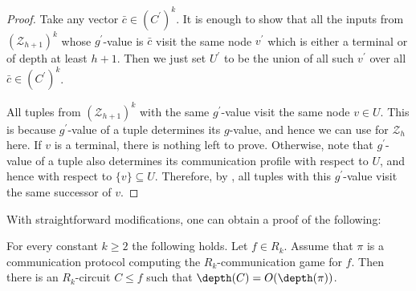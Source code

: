 \begin{proof}
 Take any vector $\bar{c} \in (C^\prime)^k$. It is enough to show that all the inputs from $(\mathcal{Z}_{h + 1})^k$ whose  $g^\prime$-value is $\bar{c}$ visit the same node $v^\prime$ which is either a terminal or of depth at least $h + 1$. Then we just set $U^\prime$ to be the union of all such $v^\prime$ over all $\bar{c} \in (C^\prime)^k$.

  All tuples from $(\mathcal{Z}_{h + 1})^k$ with the same $g^\prime$-value visit the same node $v\in U$. This is because $g^\prime$-value of a tuple determines its $g$-value, and hence we can use  for $\mathcal{Z}_{h}$ here.  If $v$ is a terminal, there is nothing left to prove. Otherwise, note that $g^\prime$-value of a tuple also determines its communication profile with respect to $U$, and hence with respect to $\{v\} \subseteq U$. Therefore,  by , all tuples with this $g^\prime$-value visit the same successor of $v$.
\end{proof}

With straightforward modifications, one can obtain a proof of the following:
\begin{proposition}
\label{R_k_to_circuits}
For every constant $k\ge 2$ the following holds. Let $f\in R_k$. Assume that $\pi$ is a communication protocol computing the $R_k$-communication game for $f$. Then there is an $R_k$-circuit $C \le f$ such that $\depth(C) = O(\depth(\pi))$.
\end{proposition}

